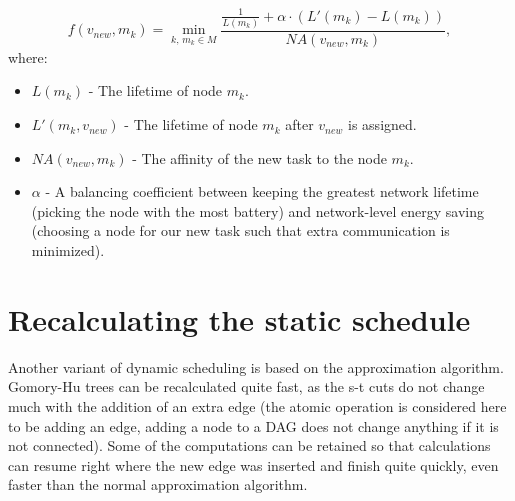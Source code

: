 \begin{equation}
 f(v_{new},m_k) = \min_{k,\,m_k\in M} \frac{\displaystyle \frac{1}{L(m_k)} + \alpha \cdot (L'(m_k) - L(m_k))}{NA(v_{new},m_k)},
\end{equation}
where:
\begin{itemize}
 \item $L(m_k)$ - The lifetime of node $m_k$.
\item $L'(m_k,v_{new})$ - The lifetime of node $m_k$ after $v_{new}$ is assigned.
\item $NA(v_{new},m_k)$ - The affinity of the new task to the node $m_k$.
\item $\alpha$ - A balancing coefficient between keeping the greatest network lifetime (picking the node with the most battery) 
and network-level energy saving (choosing a node for our new task such that extra communication is minimized).
\end{itemize}


\section{Recalculating the static schedule}

Another variant of dynamic scheduling is based on the approximation algorithm. Gomory-Hu trees can be recalculated quite fast, 
as the s-t cuts do not change much with the addition of an extra edge (the atomic operation is considered here to be adding
an edge, adding a node to a DAG does not change anything if it is not connected). Some of the computations can be retained
so that calculations can resume right where the new edge was inserted and finish quite quickly, even faster than the normal 
approximation algorithm.